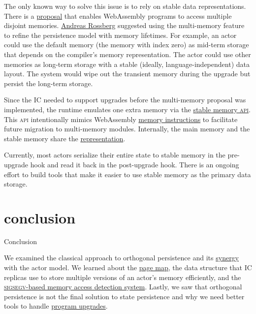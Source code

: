 \documentclass{article}
\begin{document}
The only known way to solve this issue is to rely on stable data representations.
There is a \href{https://github.com/WebAssembly/multi-memory}{proposal} that enables WebAssembly programs to access multiple disjoint memories.
\href{https://people.mpi-sws.org/~rossberg/}{Andreas Rossberg} suggested using the multi-memory feature to refine the persistence model with memory lifetimes.
For example, an actor could use the default memory (the memory with index zero) as mid-term storage that depends on the compiler's memory representation.
The actor could use other memories as long-term storage with a stable (ideally, language-independent) data layout.
The system would wipe out the transient memory during the upgrade but persist the long-term storage. 

Since the IC needed to support upgrades before the multi-memory proposal was implemented, the runtime emulates one extra memory via the \href{https://smartcontracts.org/docs/interface-spec/index.html#system-api-stable-memory}{stable memory \textsc{api}}.
This \textsc{api} intentionally mimics WebAssembly \href{https://webassembly.github.io/bulk-memory-operations/core/exec/instructions.html#memory-instructions}{memory instructions} to facilitate future migration to multi-memory modules.
Internally, the main memory and the stable memory share the \href{#snapshots-deltas}{representation}.

Currently, most actors serialize their entire state to stable memory in the pre-upgrade hook and read it back in the post-upgrade hook.
There is an ongoing effort to build tools that make it easier to use stable memory as the primary data storage.

\section{conclusion}{Conclusion}

We examined the classical approach to orthogonal persistence and its \href{#actors}{synergy} with the actor model.
We learned about the \href{#snapshots-deltas}{page map}, the data structure that IC replicas use to store multiple versions of an actor's memory efficiently, and the \href{#signal-handler}{\textsc{sigsegv}-based memory access detection system}.
Lastly, we saw that orthogonal persistence is not the final solution to state persistence and why we need better tools to handle \href{#upgrades}{program upgrades}.
\end{document}
